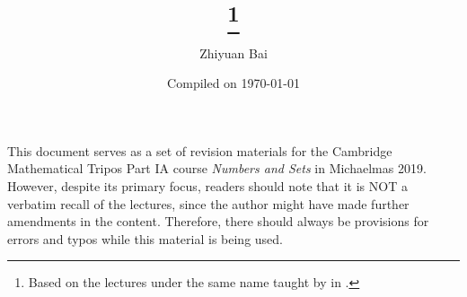 \documentclass[a4paper]{article}
\title{\triposcourse{}
\thanks{Based on the lectures under the same name taught by \triposlecturer{} in \triposterm{}.}}
\author{Zhiyuan Bai}
\date{Compiled on \today}
\newcommand{\triposcourse}{Numbers and Sets}
\newcommand{\triposterm}{Michaelmas 2019}
\newcommand{\tripospart}{IA}
\theoremstyle{plain}
\theoremstyle{definition}
\theoremstyle{remark}
\begin{document}
    \maketitle
    This document serves as a set of revision materials for the Cambridge Mathematical Tripos Part \tripospart{} course \textit{\triposcourse{}} in \triposterm{}.
    However, despite its primary focus, readers should note that it is NOT a verbatim recall of the lectures, since the author might have made further amendments in the content.
    Therefore, there should always be provisions for errors and typos while this material is being used.
    \tableofcontents
    
    
    
    
    
    
    
    
    
\end{document}
